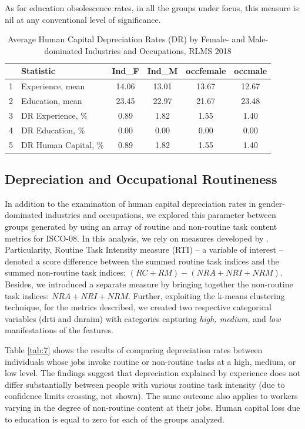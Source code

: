 \documentclass[12pt,a4paper]{article}
\numberwithin{equation}{section}
\begin{document}
As for education obsolescence rates, in all the groups under focus, this measure is nil at any conventional level of significance.

\begin{table}[H]
	\centering 
	\caption{Average Human Capital Depreciation Rates (DR) by Female- and Male-dominated Industries and Occupations, RLMS 2018} 
	\label{tab:6} 
	\begin{tabular}{clcccc}
		\hline
		& \textbf{Statistic} &\textbf{Ind\_F}& \textbf{Ind\_M} & \textbf{occfemale} & \textbf{occmale} \\ 
		\hline
		1 & Experience, mean & 14.06 & 13.01 & 13.67 & 12.67 \\ 
		2 & Education, mean & 23.45 & 22.97 & 21.67 & 23.48 \\ 
		\midrule
		3 & DR Experience, \% & 0.89 & 1.82 & 1.55 & 1.40 \\ 
		4 & DR Education, \% & 0.00 & 0.00 & 0.00 & 0.00 \\ 
		5 & DR Human Capital, \% & 0.89 & 1.82 & 1.55 & 1.40 \\ 
		\hline
	\end{tabular}
\end{table} 


\subsection*{Depreciation and Occupational Routineness}

In addition to the examination of human capital depreciation rates in gender-dominated industries and occupations, we explored this parameter between groups generated by using an array of routine and non-routine task content metrics for ISCO-08. In this analysis, we rely on measures developed by \citet{mihaylov_152._2019}. Particularity, Routine Task Intensity measure (RTI) -- a variable of interest -- denoted a score difference between the summed routine task indices and the summed non-routine task indices: $(RC + RM) - (NRA + NRI + NRM)$. Besides, we introduced a separate measure by bringing together the non-routine task indices: $NRA + NRI + NRM$. Further, exploiting the k-means clustering technique, for the metrics described, we created two respective categorical variables (drti and dnraim) with categories capturing \textit{high, medium,} and \textit{low} manifestations of the features.

Table \ref{tab:7} shows the results of comparing depreciation rates between individuals whose jobs invoke routine or non-routine tasks at a high, medium, or low level. The findings suggest that depreciation explained by experience does not differ substantially between people with various routine task intensity (due to confidence limits crossing, not shown). The same outcome also applies to workers varying in the degree of non-routine content at their jobs. Human capital loss due to education is equal to zero for each of the groups analyzed.
\end{document}
